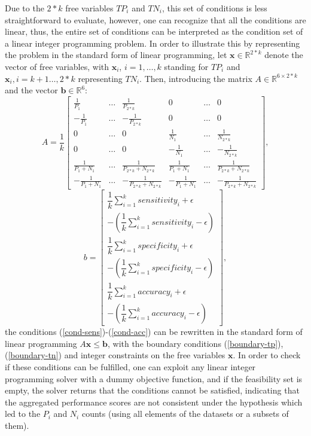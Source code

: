\documentclass[5p, final]{elsarticle}
\begin{document}
Due to the $2*k$ free variables $TP_i$ and $TN_i$, this set of conditions is less straightforward to evaluate, however, one can recognize that all the conditions are linear, thus, the entire set of conditions can be interpreted as the condition set of a linear integer programming problem. In order to illustrate this by representing the problem in the standard form of linear programming, let $\mathbf{x}\in\mathbb{R}^{2*k}$ denote the vector of free variables, with $\mathbf{x}_i$, $i=1,\dots,k$ standing for $TP_i$ and $\mathbf{x}_i, i=k+1\dots,2*k$ representing $TN_i$. Then, introducing the matrix $A\in\mathbb{R}^{6\times 2*k}$ and the vector $\mathbf{b}\in\mathbb{R}^{6}$:
\begin{equation}
A= \dfrac{1}{k}\left[\begin{array}{cccccc}
\frac{1}{P_1} & \dots & \frac{1}{P_{2*k}} & 0 & \dots & 0 \\
-\frac{1}{P_1} & \dots & -\frac{1}{P_{2*k}} & 0 & \dots & 0 \\
0 & \dots & 0 & \frac{1}{N_1} & \dots & \frac{1}{N_{2*k}}\\
0 & \dots & 0 & -\frac{1}{N_1} & \dots & -\frac{1}{N_{2*k}}\\
\frac{1}{P_1 + N_1} & \dots & \frac{1}{P_{2*k} + N_{2*k}} & \frac{1}{P_1+ N_1} & \dots & \frac{1}{P_{2*k}+N_{2*k}} \\
-\frac{1}{P_1 + N_1} & \dots & -\frac{1}{P_{2*k} + N_{2*k}} & -\frac{1}{P_1 + N_1} & \dots & -\frac{1}{P_{2*k}+ N_{2*k}}
\end{array}\right],
\end{equation}
\begin{equation}
b= \left[\begin{array}{c}\dfrac{1}{k}\sum\limits_{i=1}^k{sensitivity_i} + \epsilon \\
-(\dfrac{1}{k}\sum\limits_{i=1}^k{sensitivity_i} - \epsilon) \\
\dfrac{1}{k}\sum\limits_{i=1}^k{specificity_i} + \epsilon \\
-(\dfrac{1}{k}\sum\limits_{i=1}^k{specificity_i} - \epsilon) \\
\dfrac{1}{k}\sum\limits_{i=1}^k{accuracy_i} + \epsilon \\
-(\dfrac{1}{k}\sum\limits_{i=1}^k{accuracy_i} - \epsilon)
\end{array}\right],
\end{equation}
the conditions (\ref{cond-sens})-(\ref{cond-acc}) can be rewritten in the standard form of linear programming
$A\mathbf{x}  \leq \mathbf{b}$,
with the boundary conditions (\ref{boundary-tp}), (\ref{boundary-tn}) and integer constraints on the free variables $\mathbf{x}$. In order to check if these conditions can be fulfilled, one can exploit any linear integer programming solver with a dummy objective function, and if the feasibility set is empty, the solver returns that the conditions cannot be satisfied, indicating that the aggregated performance scores are not consistent under the hypothesis which led to the $P_i$ and $N_i$ counts (using all elements of the datasets or a subsets of them).
\end{document}
